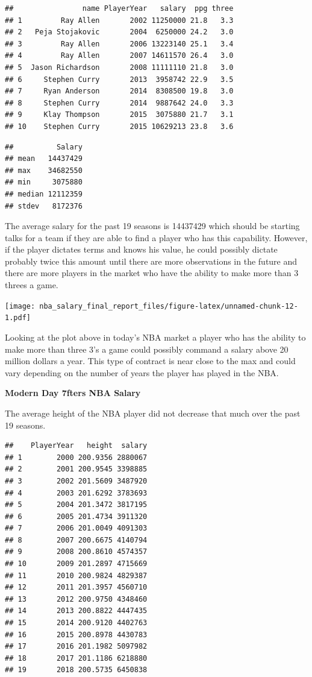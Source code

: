 \documentclass[]{article}
\begin{document}
\begin{verbatim}
##                name PlayerYear   salary  ppg three
## 1         Ray Allen       2002 11250000 21.8   3.3
## 2   Peja Stojakovic       2004  6250000 24.2   3.0
## 3         Ray Allen       2006 13223140 25.1   3.4
## 4         Ray Allen       2007 14611570 26.4   3.0
## 5  Jason Richardson       2008 11111110 21.8   3.0
## 6     Stephen Curry       2013  3958742 22.9   3.5
## 7     Ryan Anderson       2014  8308500 19.8   3.0
## 8     Stephen Curry       2014  9887642 24.0   3.3
## 9     Klay Thompson       2015  3075880 21.7   3.1
## 10    Stephen Curry       2015 10629213 23.8   3.6
\end{verbatim}

\begin{verbatim}
##          Salary
## mean   14437429
## max    34682550
## min     3075880
## median 12112359
## stdev   8172376
\end{verbatim}

The average salary for the past 19 seasons is 14437429 which should be
starting talks for a team if they are able to find a player who has this
capability. However, if the player dictates terms and knows his value,
he could possibly dictate probably twice this amount until there are
more observations in the future and there are more players in the market
who have the ability to make more than 3 threes a game.

\texttt{[image: nba\_salary\_final\_report\_files/figure-latex/unnamed-chunk-12-1.pdf]}

Looking at the plot above in today's NBA market a player who has the
ability to make more than three 3's a game could possibly command a
salary above 20 million dollars a year. This type of contract is near
close to the max and could vary depending on the number of years the
player has played in the NBA.

\textbf{Modern Day 7fters NBA Salary}

The average height of the NBA player did not decrease that much over the
past 19 seasons.

\begin{verbatim}
##    PlayerYear   height  salary
## 1        2000 200.9356 2880067
## 2        2001 200.9545 3398885
## 3        2002 201.5609 3487920
## 4        2003 201.6292 3783693
## 5        2004 201.3472 3817195
## 6        2005 201.4734 3911320
## 7        2006 201.0049 4091303
## 8        2007 200.6675 4140794
## 9        2008 200.8610 4574357
## 10       2009 201.2897 4715669
## 11       2010 200.9824 4829387
## 12       2011 201.3957 4560710
## 13       2012 200.9750 4348460
## 14       2013 200.8822 4447435
## 15       2014 200.9120 4402763
## 16       2015 200.8978 4430783
## 17       2016 201.1982 5097982
## 18       2017 201.1186 6218880
## 19       2018 200.5735 6450838
\end{verbatim}
\end{document}
